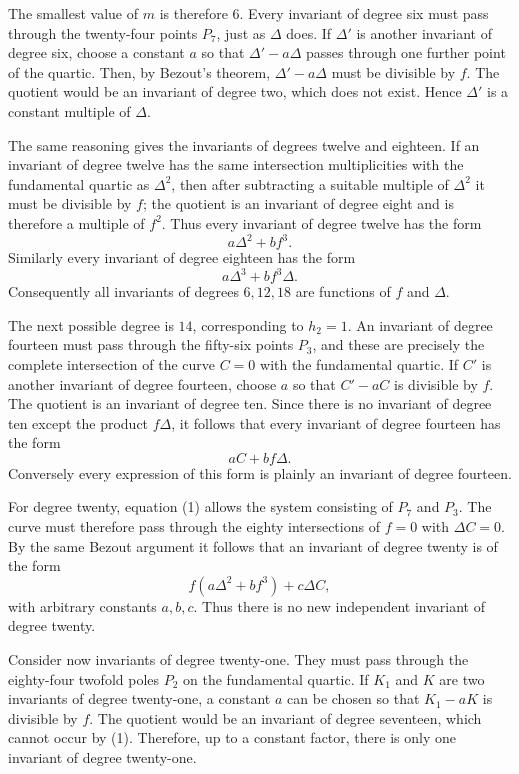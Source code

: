 \documentclass[11pt,a4paper]{book}
\begin{document}
The smallest value of \(m\) is therefore \(6\).  Every invariant of degree six must pass through the twenty-four points \(P_7\), just as \(\Delta\) does.  If \(\Delta'\) is another invariant of degree six, choose a constant \(a\) so that \(\Delta'-a\Delta\) passes through one further point of the quartic.  Then, by Bezout's theorem, \(\Delta'-a\Delta\) must be divisible by \(f\).  The quotient would be an invariant of degree two, which does not exist.  Hence \(\Delta'\) is a constant multiple of \(\Delta\).

The same reasoning gives the invariants of degrees twelve and eighteen.  If an invariant of degree twelve has the same intersection multiplicities with the fundamental quartic as \(\Delta^2\), then after subtracting a suitable multiple of \(\Delta^2\) it must be divisible by \(f\); the quotient is an invariant of degree eight and is therefore a multiple of \(f^2\).  Thus every invariant of degree twelve has the form
\[
 a\Delta^2+b f^3.
\]
Similarly every invariant of degree eighteen has the form
\[
 a\Delta^3+b f^3\Delta.
\]
Consequently all invariants of degrees \(6,12,18\) are functions of \(f\) and \(\Delta\).

The next possible degree is \(14\), corresponding to \(h_2=1\).  An invariant of degree fourteen must pass through the fifty-six points \(P_3\), and these are precisely the complete intersection of the curve \(C=0\) with the fundamental quartic.  If \(C'\) is another invariant of degree fourteen, choose \(a\) so that \(C'-aC\) is divisible by \(f\).  The quotient is an invariant of degree ten.  Since there is no invariant of degree ten except the product \(f\Delta\), it follows that every invariant of degree fourteen has the form
\[
 aC+bf\Delta.
\]
Conversely every expression of this form is plainly an invariant of degree fourteen.

For degree twenty, equation (1) allows the system consisting of \(P_7\) and \(P_3\).  The curve must therefore pass through the eighty intersections of \(f=0\) with \(\Delta C=0\).  By the same Bezout argument it follows that an invariant of degree twenty is of the form
\[
 f(a\Delta^2+b f^3)+c\Delta C,
\]
with arbitrary constants \(a,b,c\).  Thus there is no new independent invariant of degree twenty.

Consider now invariants of degree twenty-one.  They must pass through the eighty-four twofold poles \(P_2\) on the fundamental quartic.  If \(K_1\) and \(K\) are two invariants of degree twenty-one, a constant \(a\) can be chosen so that \(K_1-aK\) is divisible by \(f\).  The quotient would be an invariant of degree seventeen, which cannot occur by (1).  Therefore, up to a constant factor, there is only one invariant of degree twenty-one.
\end{document}
